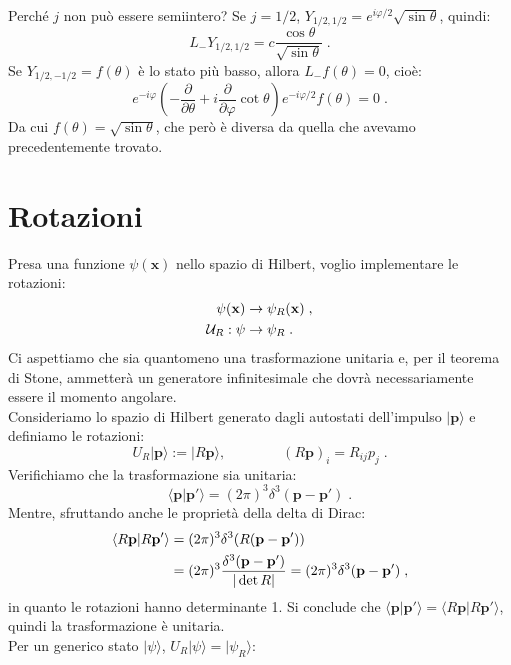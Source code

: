 \documentclass[10pt,a4paper]{report}
\theoremstyle{definition}
\numberwithin{equation}{section}
\newcommand{\bra}{\langle}
\newcommand{\ket}{\rangle}
\begin{document}
Perché $j$ non può essere semiintero? Se $j=1/2$, $Y_{1/2,1/2}=e^{i\varphi/2}\sqrt{\sin\theta}$, quindi:
\begin{equation}
L_-Y_{1/2,1/2}=c\frac{\cos\theta}{\sqrt{\sin\theta}}\;.
\end{equation}
Se $Y_{1/2,-1/2}=f(\theta)$ è lo stato più basso, allora $L_-f(\theta)=0$, cioè:
\begin{equation}
e^{-i\varphi}\left(-\frac{\partial}{\partial\theta}+i\frac{\partial}{\partial\varphi}\cot\theta\right)e^{-i\varphi/2}f(\theta)=0\;.
\end{equation}
Da cui $f(\theta)=\sqrt{\sin\theta}$, che però è diversa da quella che avevamo precedentemente trovato.
\section{Rotazioni}
Presa una funzione $\psi(\mathbf{x})$ nello spazio di Hilbert, voglio implementare le rotazioni:
\begin{align}
\psi(\mathbf{x}) &\to \psi_R(\mathbf{x}) \notag\;, \\
\mathcal{U}_R:\psi &\to \psi_R\;.
\end{align}
Ci aspettiamo che sia quantomeno una trasformazione unitaria e, per il teorema di Stone, ammetterà un generatore infinitesimale che dovrà necessariamente essere il momento angolare. \\
Consideriamo lo spazio di Hilbert generato dagli autostati dell'impulso $|\mathbf{p}\ket$ e definiamo le rotazioni:
\begin{equation}
U_R|\mathbf{p}\ket:=|R\mathbf{p}\ket, \qquad \qquad (R\mathbf{p})_i=R_{ij}p_j\;.
\end{equation}
Verifichiamo che la trasformazione sia unitaria:
\begin{equation}
\bra \mathbf{p}|\mathbf{p}'\ket=(2\pi)^3\delta^3(\mathbf{p}-\mathbf{p}')\;.
\end{equation}
Mentre, sfruttando anche le proprietà della delta di Dirac:
\begin{align}
\bra R\mathbf{p}|R\mathbf{p}'\ket &= (2\pi)^3\delta^3(R(\mathbf{p}-\mathbf{p}'))  \notag \\
&= (2\pi)^3 \frac{\delta^3(\mathbf{p}-\mathbf{p}')}{|\det R|}=(2\pi)^3\delta^3(\mathbf{p}-\mathbf{p}')\;,
\end{align}
in quanto le rotazioni hanno determinante 1. Si conclude che $\bra \mathbf{p}|\mathbf{p}'\ket=\bra R\mathbf{p}|R\mathbf{p}'\ket$, quindi la trasformazione è unitaria. \\
Per un generico stato $|\psi\ket$, $U_R|\psi\ket=|\psi_R\ket$:
\end{document}

